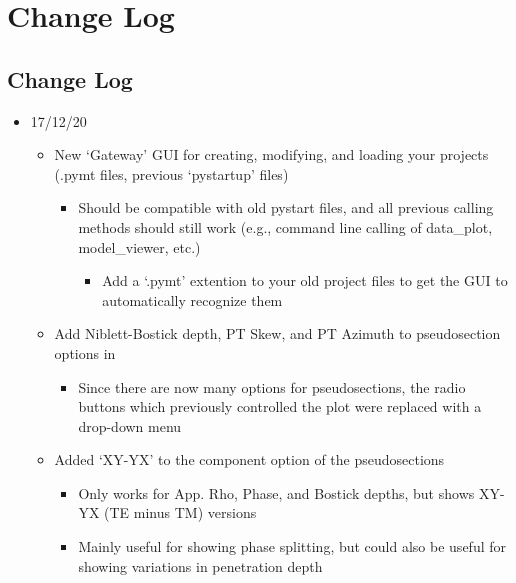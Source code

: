 \documentclass[letterpaper,10pt,english]{sphinxmanual}
\begin{document}
\section{Change Log}
\label{\detokenize{index:change-log}}

\subsection{Change Log}
\label{\detokenize{content/misc/changelog:change-log}}\label{\detokenize{content/misc/changelog::doc}}\begin{itemize}
\item {} 
17/12/20
\begin{itemize}
\item {} 
New ‘Gateway’ GUI for creating, modifying, and loading your projects (.pymt files, previous ‘pystartup’ files)
\begin{itemize}
\item {} 
Should be compatible with old pystart files, and all previous calling methods should still work (e.g., command line calling of data\_plot, model\_viewer, etc.)
\begin{itemize}
\item {} 
Add a ‘.pymt’ extention to your old project files to get the GUI to automatically recognize them

\end{itemize}

\end{itemize}

\item {} 
Add Niblett-Bostick depth, PT Skew, and PT Azimuth to pseudosection options in {\hyperref[\detokenize{content/data_plot/map_viewer:map-viewer}]{}}
\begin{itemize}
\item {} 
Since there are now many options for pseudosections, the radio buttons which previously controlled the plot were replaced with a drop-down menu

\end{itemize}

\item {} 
Added ‘XY-YX’ to the component option of the pseudosections
\begin{itemize}
\item {} 
Only works for App. Rho, Phase, and Bostick depths, but shows XY-YX (TE minus TM) versions

\item {} 
Mainly useful for showing phase splitting, but could also be useful for showing variations in penetration depth


\end{itemize}
\end{itemize}
\end{itemize}
\end{document}
